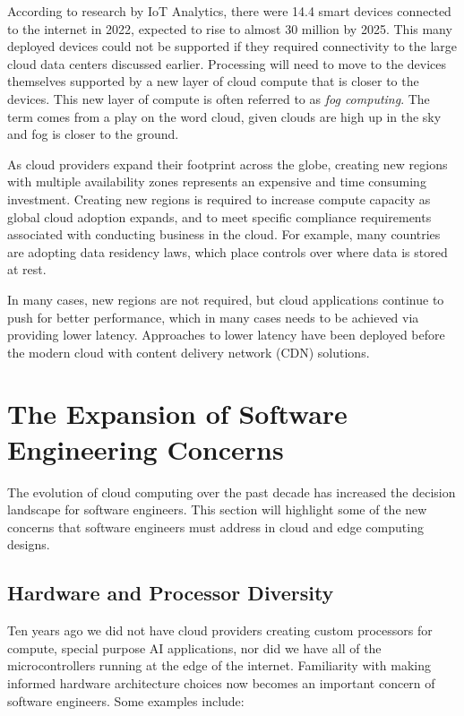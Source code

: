 \documentclass[conference]{IEEEtran}
\begin{document}
According to research by IoT Analytics, there were 14.4 smart devices connected to the internet in 2022, expected to rise to almost 30 million by 2025\cite{IoTMarket}.  This many deployed devices could not be supported if they required connectivity to the large cloud data centers discussed earlier. Processing will need to move to the devices themselves supported by a new layer of cloud compute that is closer to the devices.  This new layer of compute is often referred to as \textit{fog computing}.  The term comes from a play on the word cloud, given clouds are high up in the sky and fog is closer to the ground.   


As cloud providers expand their footprint across the globe, creating new regions with multiple availability zones represents an expensive and time consuming investment. Creating new regions is required to increase compute capacity as global cloud adoption expands, and to meet specific compliance requirements associated with conducting business in the cloud. For example, many countries are adopting data residency laws, which place controls over where data is stored at rest. 

In many cases, new regions are not required, but cloud applications continue to push for better performance, which in many cases needs to be achieved via providing lower latency.  Approaches to lower latency have been deployed before the modern cloud with content delivery network (CDN)\cite{CDN} solutions.

\section{The Expansion of Software Engineering Concerns}
\label{sec:Polyglot}
The evolution of cloud computing over the past decade has increased the decision landscape for software engineers. This section will highlight some of the new concerns that software engineers must address in cloud and edge computing designs.

\subsection{Hardware and Processor Diversity}
Ten years ago we did not have cloud providers creating custom processors for compute, special purpose AI applications, nor did we have all of the microcontrollers running at the edge of the internet. Familiarity with making informed hardware architecture choices now becomes an important concern of software engineers. Some examples include:
\end{document}
